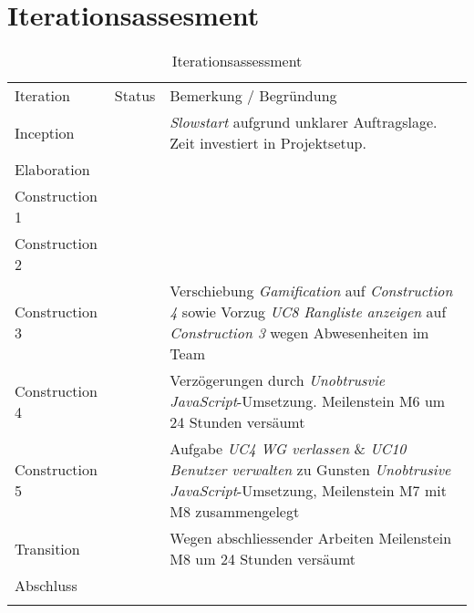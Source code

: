 \chapter{Iterationsassesment}

\begin{table}[H]
	\tablestyle
	\tablealtcolored
	\begin{tabularx}{\textwidth}{l c X}
		\tableheadcolor
		\tablehead Iteration &
		\tablehead Status &
		\tablehead Bemerkung / Begründung \tabularnewline
		\tablebody
			Inception & \faOk & \emph{Slowstart} aufgrund unklarer Auftragslage. Zeit investiert in Projektsetup.\tabularnewline
			Elaboration & \faOk & \tabularnewline
			Construction 1 & \faOk & \tabularnewline
			Construction 2 & \faOk & \tabularnewline
			Construction 3 & \faExclamation & Verschiebung \emph{Gamification} auf \emph{Construction 4} sowie Vorzug \emph{UC8 Rangliste anzeigen} auf \emph{Construction 3} wegen Abwesenheiten im Team\tabularnewline
			Construction 4 & \faExclamation & Verzögerungen durch \emph{Unobtrusvie JavaScript}-Umsetzung. Meilenstein M6 um 24 Stunden versäumt \tabularnewline
			Construction 5 & \faExclamation & Aufgabe \emph{UC4 WG verlassen} \& \emph{UC10 Benutzer verwalten} zu Gunsten \emph{Unobtrusive JavaScript}-Umsetzung, Meilenstein M7 mit M8 zusammengelegt \tabularnewline
			Transition & \faExclamation & Wegen abschliessender Arbeiten Meilenstein M8 um 24 Stunden versäumt \tabularnewline
			Abschluss & \faOk & \tabularnewline
		\tableend
	\end{tabularx}
	\caption{Iterationsassessment}
	\label{tab:iterationAssessment}
\end{table}